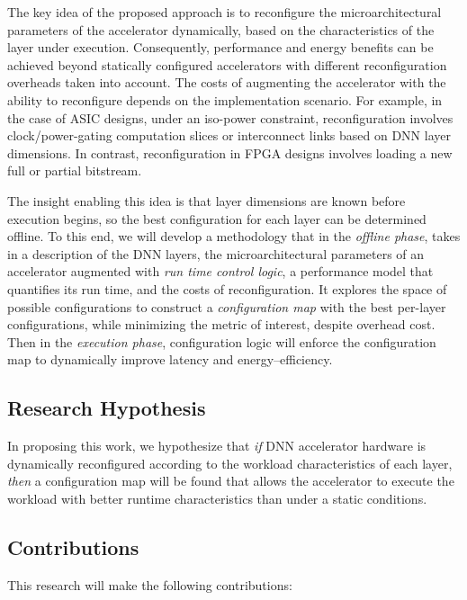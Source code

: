 The key idea of the proposed approach is to reconfigure the microarchitectural parameters of the accelerator dynamically, based on the characteristics of the layer under execution.
Consequently, performance and energy benefits can be achieved beyond statically configured accelerators with different reconfiguration overheads taken into account.
The costs of augmenting the accelerator with the ability to reconfigure depends on the implementation scenario.
For example, in the case of ASIC designs, under an iso-power constraint, reconfiguration involves clock/power-gating computation slices or interconnect links based on DNN layer dimensions.
In contrast, reconfiguration in FPGA designs involves loading a new full or partial bitstream.

The insight enabling this idea is that layer dimensions are known before execution begins, so the best configuration for each layer can be determined offline.
To this end, we will develop a methodology that in the \emph{offline phase}, takes in a description of the DNN layers, the microarchitectural parameters of an accelerator augmented with \emph{run time control logic}, a performance model that quantifies its run time, and the costs of reconfiguration.
It explores the space of possible configurations to construct a \emph{configuration map} with the best per-layer configurations, while minimizing the metric of interest, despite overhead cost.
Then in the \emph{execution phase}, configuration logic will enforce the configuration map to dynamically improve latency and energy--efficiency.

\subsection{Research Hypothesis}
In proposing this work, we hypothesize that \textit{if} DNN accelerator hardware is dynamically reconfigured according to the workload characteristics of each layer, \textit{then} a configuration map will be found that allows the accelerator to execute the workload with better runtime characteristics than under a static conditions.

\subsection{Contributions}
This research will make the following contributions:


